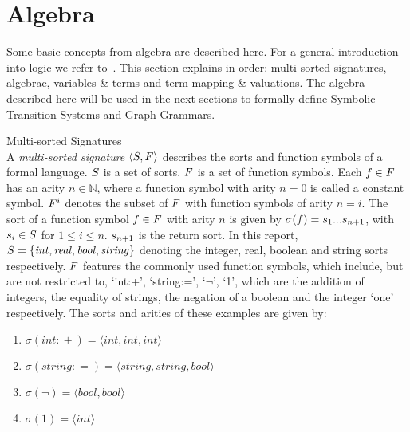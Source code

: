 \section{Algebra}\label{sec:algebra}

Some basic concepts from algebra are described here. For a general introduction into logic we refer to~\cite{Huth:logic}. This section explains in order: multi-sorted signatures, algebrae, variables \& terms and term-mapping \& valuations. The algebra described here will be used in the next sections to formally define Symbolic Transition Systems and Graph Grammars.

\vspace{10px}\begin{definition} Multi-sorted Signatures \\
A \textit{multi-sorted signature} $\langle S, F \rangle$ describes the sorts and function symbols of a formal language. $S$ is a set of sorts. $F$ is a set of function symbols. Each $f \in F$ has an arity $n \in \mathbb{N}$, where a function symbol with arity $n = 0$ is called a constant symbol. $F^i$ denotes the subset of $F$ with function symbols of arity $n = i$. The sort of a function symbol $f \in F$ with arity $n$ is given by $\sigma(f) = s_1 ... s_{n+1}$, with $s_i \in S$ for $1 \leq i \leq n$. $s_{n+1}$ is the return sort. In this report, $S =  \{\mathit{int, real, bool, string}\}$ denoting the integer, real, boolean and string sorts respectively. $F$ features the commonly used function symbols, which include, but are not restricted to, `int:+', `string:=', `$\neg$', `1', which are the addition of integers, the equality of strings, the negation of a boolean and the integer `one' respectively. The sorts and arities of these examples are given by:
\begin{enumerate}
\item $\sigma(\mathit{int:}+) = \langle int, int, int\rangle$
\item $\sigma(\mathit{string:}=) = \langle string, string, bool\rangle$
\item $\sigma(\neg) = \langle bool, bool\rangle$
\item $\sigma(1) = \langle int \rangle$
\end{enumerate}
\end{definition}

